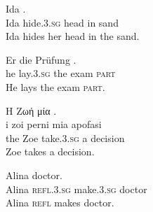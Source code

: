 \documentclass[output=paper,modfonts]{langscibook}
\begin{document}


\ea \label{sl:skrivati-glavo-v-pesek}
\settowidth {} 
\gll Ida    . \\
Ida hide.\textsc{3.sg} head in sand \\ 
\glt Ida hides her head in the sand. 
\z

\ea \label{de:pruefung-ablegen}
\settowidth {} 
\gll Er  die Prüfung . \\
he lay.\textsc{3.sg} the exam \textsc{part} \\ 
\glt He lays the exam \textsc{part}. 
\z

\ea \label{el:take-decision}
\settowidth {} 
\glll Η Ζωή  μία .\\
i zoi perni mia apofasi \\
the Zoe take.\textsc{3.sg} a decision \\ 
\glt Zoe takes a decision. 
\z

\ea \label{ro:se-face}
\settowidth {} 
\gll Alina   doctor.\\
Alina \textsc{refl.3.sg} make.\textsc{3.sg} doctor \\ 
\glt Alina \textsc{refl} makes doctor. 
\z
\end{document}
